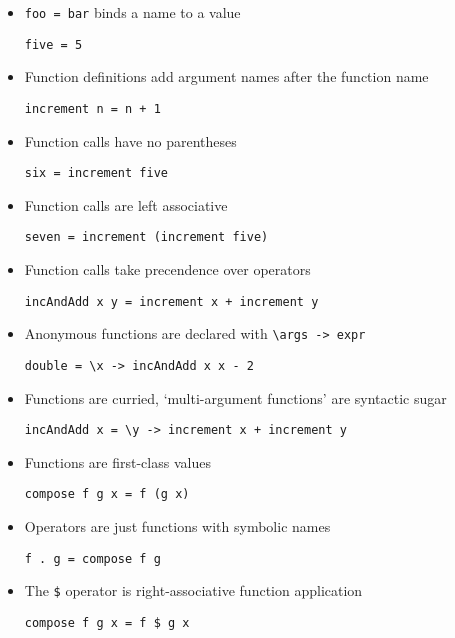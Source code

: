 \begin{itemize}
\item \verb|foo = bar| binds a name to a value
\begin{verbatim}
five = 5
\end{verbatim}

\item Function definitions add argument names after the function name
\begin{verbatim}
increment n = n + 1
\end{verbatim}

\item Function calls have no parentheses
\begin{verbatim}
six = increment five
\end{verbatim}

\item Function calls are left associative
\begin{verbatim}
seven = increment (increment five)
\end{verbatim}

\item Function calls take precendence over operators
\begin{verbatim}
incAndAdd x y = increment x + increment y
\end{verbatim}

\item Anonymous functions are declared with \verb|\args -> expr|
\begin{verbatim}
double = \x -> incAndAdd x x - 2
\end{verbatim}

\item Functions are curried, `multi-argument functions' are syntactic
  sugar
\begin{verbatim}
incAndAdd x = \y -> increment x + increment y
\end{verbatim}

\item Functions are first-class values
\begin{verbatim}
compose f g x = f (g x)
\end{verbatim}

\item Operators are just functions with symbolic names
\begin{verbatim}
f . g = compose f g
\end{verbatim}

\pagebreak
\item The \verb|$| operator is right-associative function application
\begin{verbatim}
compose f g x = f $ g x
\end{verbatim}


\end{itemize}
